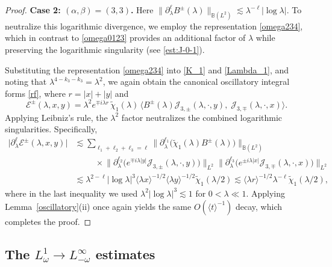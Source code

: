 \documentclass[reqno]{amsart}
\numberwithin{equation}{section}
\begin{document}
\begin{proof}
\textbf{Case 2: $(\alpha, \beta) = (3,3)$.}
Here $\|\partial_\lambda^{\ell} B^\pm(\lambda)\|_{\mathbb{B}(L^2)} \lesssim \lambda^{-\ell}|\log\lambda|$. 
To neutralize this logarithmic divergence, we employ the representation \eqref{omega234}, 
which in contrast to \eqref{omega0123} provides an additional factor of $\lambda$ while preserving the  logarithmic singularity (see \eqref{est:J-0-1}).



	
	Substituting the representation  \eqref{omega234} into \eqref{K_1} and \eqref{Lambda_1}, and noting that $\lambda^{4 - k_3 - k_3} = \lambda^2$, we again obtain the canonical oscillatory integral forms \eqref{rf}, where $r = |x| + |y|$ and
\[
\mathcal{E}^\pm(\lambda, x,y) = \lambda^2 e^{\mp i\lambda r}\,\widetilde{\chi}_1(\lambda)\,
\bigl\langle B^\pm(\lambda) \mathcal{J}_{3,\pm}(\lambda,\cdot,y),\; \mathcal{J}_{3,\mp}(\lambda,\cdot,x) \bigr\rangle.
\]
	Applying Leibniz's rule, the $\lambda^2$ factor neutralizes the combined logarithmic singularities. Specifically,
	$$
	\begin{aligned}
			\bigl|\partial_\lambda^{\ell} \mathcal{E}^\pm(\lambda, x,y) \bigr|
		& \lesssim \sum_{\ell_1+\ell_2+\ell_3 =\ell}
		 \bigl\|\partial_\lambda^{\ell_1}\bigl(\widetilde{\chi}_1(\lambda) B^\pm (\lambda)\bigr) \bigr\|_{\mathbb{B}(L^2)} \\
		 & \ \ \ \ \ \ \ \ \ \ \  \times  \bigl\|\partial_\lambda^{\ell_2} \big(e^{\mp i \lambda|y|}\mathcal{J}_{3,\pm}(\lambda,\cdot,y)\big) \bigr\|_{L^2} \bigl\|\partial_\lambda^{\ell_3} \big(e^{\pm i \lambda |x|}\mathcal{J}_{3,\mp}(\lambda,\cdot,x)\big) \bigr\|_{L^2} \\
		&\lesssim \lambda^{2-\ell} |\log\lambda|^3 \langle \lambda x \rangle^{-1/2} \langle \lambda y \rangle^{-1/2} \widetilde{\chi}_1(\lambda/2)
		\lesssim \langle \lambda r \rangle^{-1/2}\lambda^{-\ell}\widetilde{\chi}_1(\lambda/2),
	\end{aligned}
	$$
	where in the last inequality we used $\lambda^2 |\log \lambda|^3 \lesssim 1$ for $0 < \lambda \ll 1$.
	Applying Lemma~\ref{oscillatory}(ii) once again yields the same $O(\langle t\rangle^{-1})$ decay, which completes the proof.
\end{proof}

\subsection{The $L^1_\omega \to L^\infty_{-\omega}$ estimates} \label{subsec:regular_first_2}
\end{document}
